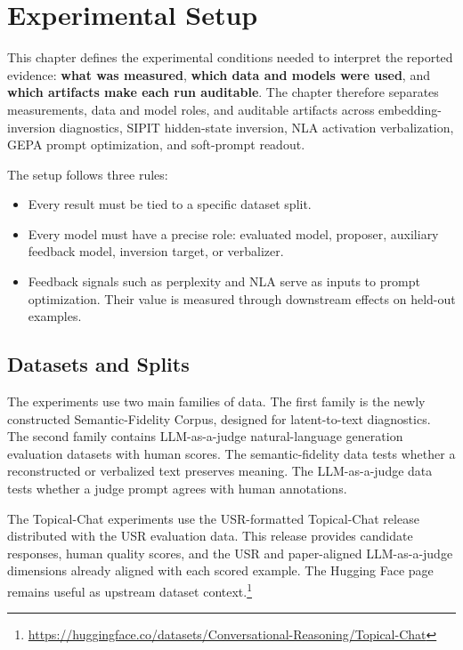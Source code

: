 \documentclass[12pt,a4paper,twoside,openright]{book}
\begin{document}
\chapter{Experimental Setup}
\label{chapter:experimental_setup}

This chapter defines the experimental conditions needed to interpret the
reported evidence: \textbf{what was measured}, \textbf{which data and models
were used}, and \textbf{which artifacts make each run auditable}. The chapter
therefore separates measurements, data and model roles, and auditable artifacts
across embedding-inversion diagnostics, SIPIT hidden-state inversion, NLA
activation verbalization, GEPA prompt optimization, and soft-prompt readout.

The setup follows three rules:
\begin{itemize}
    \item Every result must be tied to a specific dataset split.
    \item Every model must have a precise role: evaluated model, proposer,
    auxiliary feedback model, inversion target, or verbalizer.
    \item Feedback signals such as perplexity and NLA serve as inputs to prompt
    optimization. Their value is measured through downstream effects on held-out
    examples.
\end{itemize}

\section{Datasets and Splits}
\label{sec:setup-datasets}

The experiments use two main families of data. The first family is the newly
constructed Semantic-Fidelity Corpus, designed for latent-to-text diagnostics.
The second family contains LLM-as-a-judge natural-language generation evaluation
datasets with human scores. The semantic-fidelity data tests whether a
reconstructed or verbalized text preserves meaning. The LLM-as-a-judge data tests
whether a judge prompt agrees with human annotations.

The Topical-Chat experiments use the USR-formatted Topical-Chat release
distributed with the USR evaluation data.
This release provides candidate responses, human quality scores, and the
USR and paper-aligned LLM-as-a-judge dimensions already aligned with each scored example. The
Hugging Face page remains useful as upstream dataset
context.\footnote{\url{https://huggingface.co/datasets/Conversational-Reasoning/Topical-Chat}}
\end{document}
